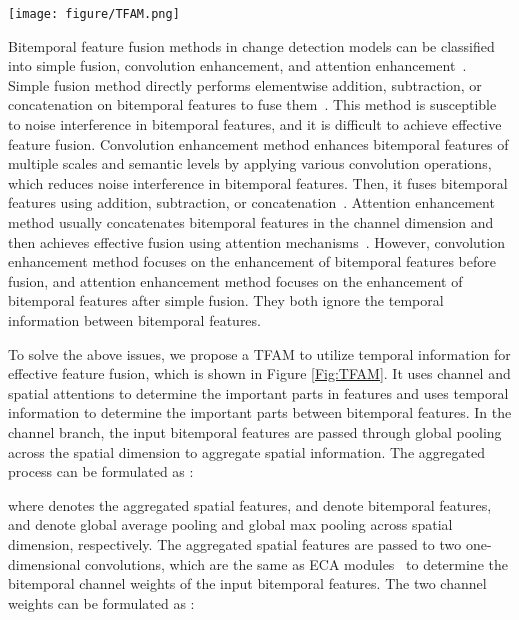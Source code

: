 \documentclass[journal]{IEEEtran}
\begin{document}
\begin{figure*}[!ht]
	\centering
		\texttt{[image: figure/TFAM.png]}
	\caption{Illustration of the structure of TFAM. T1 and T2 refer to bitemporal features. Avgpool and Maxpool denote average pooling and max pooling in the channel and spatial dimensions, respectively. Concat denotes the concatenation of two features in the channel dimension.}
 \label{Fig:TFAM}
\end{figure*}

Bitemporal feature fusion methods in change detection models can be classified into simple fusion, convolution enhancement, and attention enhancement~\cite{fcef, snu,fccdn, dsifn, olcd}. Simple fusion method directly performs elementwise addition, subtraction, or concatenation on bitemporal features to fuse them~\cite{fcef, snu}. This method is susceptible to noise interference in bitemporal features, and it is difficult to achieve effective feature fusion. Convolution enhancement method enhances bitemporal features of multiple scales and semantic levels by applying various convolution operations, which reduces noise interference in bitemporal features. Then, it fuses bitemporal features using addition, subtraction, or concatenation~\cite{fccdn}. Attention enhancement method usually concatenates bitemporal features in the channel dimension and then achieves effective fusion using attention mechanisms~\cite{dsifn, olcd}. However, convolution enhancement method focuses on the enhancement of bitemporal features before fusion, and attention enhancement method focuses on the enhancement of bitemporal features after simple fusion. They both ignore the temporal information between bitemporal features.


To solve the above issues, we propose a TFAM to utilize temporal information for effective feature fusion, which is shown in Figure \ref{Fig:TFAM}. It uses channel and spatial attentions to determine the important parts in features and uses temporal information to determine the important parts between bitemporal features. In the channel branch, the input bitemporal features are passed through global pooling across the spatial dimension to aggregate spatial information. The aggregated process can be formulated as :

where  denotes the aggregated spatial features,  and  denote bitemporal features,  and  denote global average pooling and global max pooling across spatial dimension, respectively. The aggregated spatial features are passed to two one-dimensional convolutions, which are the same as ECA modules~\cite{eca} to determine the bitemporal channel weights of the input bitemporal features. The two channel weights can be formulated as : 
\end{document}
